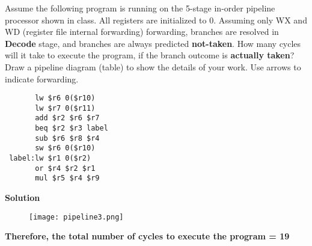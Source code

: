 \documentclass[a4paper,10pt]{article}
\begin{document}
\begin{enumerate}
Assume the following program is running on the 5-stage in-order pipeline processor shown in class. All registers are initialized to 0. Assuming only WX and WD (register file internal forwarding) forwarding, branches are resolved in \textbf{Decode} stage, and branches are always predicted \textbf{not-taken}. How many cycles will it take to execute the program, if the branch outcome is \textbf{actually taken}? Draw a pipeline diagram (table) to show the details of your work. Use arrows to indicate forwarding.
\begin{verbatim}
       lw $r6 0($r10) 
       lw $r7 0($r11) 
       add $r2 $r6 $r7 
       beq $r2 $r3 label 
       sub $r6 $r8 $r4 
       sw $r6 0($r10) 
 label:lw $r1 0($r2) 
       or $r4 $r2 $r1
       mul $r5 $r4 $r9

\end{verbatim}

\textbf{Solution}\\
 \begin{figure}[!h]
        \centering
        \texttt{[image: pipeline3.png]}
    \end{figure}
    \textbf {Therefore, the total number of cycles to execute the program = 19}
    


\end{enumerate}
\end{document}
